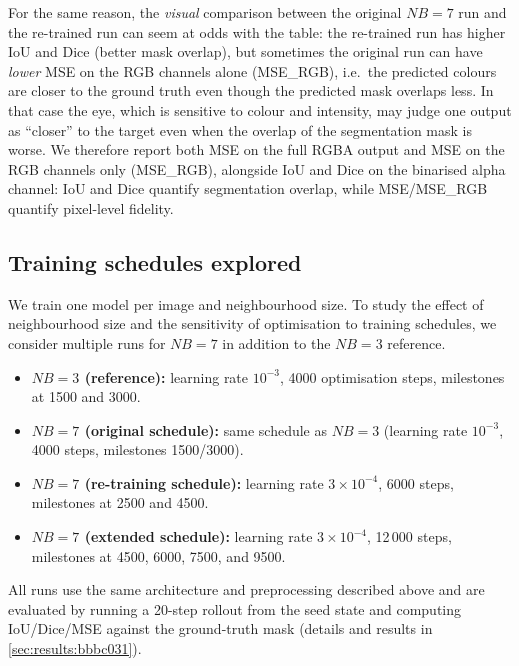 For the same reason, the \emph{visual} comparison between the original \(NB=7\) run and the re-trained run can seem at odds with the table: the re-trained run has higher IoU and Dice (better mask overlap), but sometimes the original run can have \emph{lower} MSE on the RGB channels alone (MSE\_RGB), i.e.\ the predicted colours are closer to the ground truth even though the predicted mask overlaps less.
In that case the eye, which is sensitive to colour and intensity, may judge one output as ``closer'' to the target even when the overlap of the segmentation mask is worse.
We therefore report both MSE on the full RGBA output and MSE on the RGB channels only (MSE\_RGB), alongside IoU and Dice on the binarised alpha channel: IoU and Dice quantify segmentation overlap, while MSE/MSE\_RGB quantify pixel-level fidelity.

\subsection{Training schedules explored}
\label{sec:impl:bbbc031:schedules}

We train one model per image and neighbourhood size.
To study the effect of neighbourhood size and the sensitivity of optimisation to training schedules, we consider multiple runs for \(NB=7\) in addition to the \(NB=3\) reference.

\begin{itemize}
  \item \textbf{\(NB=3\) (reference):} learning rate \(10^{-3}\), 4000 optimisation steps, milestones at 1500 and 3000.
  \item \textbf{\(NB=7\) (original schedule):} same schedule as \(NB=3\) (learning rate \(10^{-3}\), 4000 steps, milestones 1500/3000).
  \item \textbf{\(NB=7\) (re-training schedule):} learning rate \(3\times10^{-4}\), 6000 steps, milestones at 2500 and 4500.
  \item \textbf{\(NB=7\) (extended schedule):} learning rate \(3\times10^{-4}\), 12\,000 steps, milestones at 4500, 6000, 7500, and 9500.
\end{itemize}

All runs use the same architecture and preprocessing described above and are evaluated by running a 20-step rollout from the seed state and computing IoU/Dice/MSE against the ground-truth mask (details and results in \cref{sec:results:bbbc031}).


